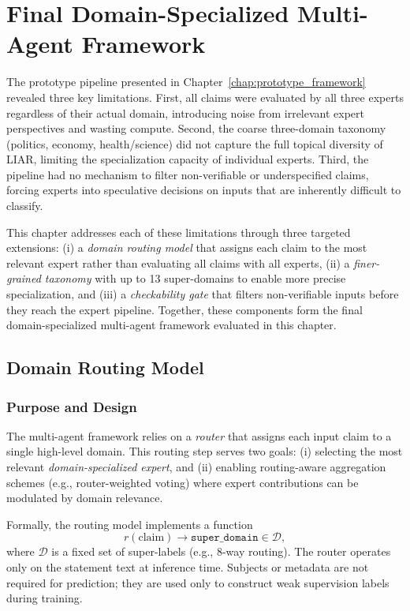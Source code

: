 \chapter{Final Domain-Specialized Multi-Agent Framework}
\label{chap:final_framework}

The prototype pipeline presented in Chapter~\ref{chap:prototype_framework} revealed three key limitations. First, all claims were evaluated by all three experts regardless of their actual domain, introducing noise from irrelevant expert perspectives and wasting compute. Second, the coarse three-domain taxonomy (politics, economy, health/science) did not capture the full topical diversity of LIAR, limiting the specialization capacity of individual experts. Third, the pipeline had no mechanism to filter non-verifiable or underspecified claims, forcing experts into speculative decisions on inputs that are inherently difficult to classify.

This chapter addresses each of these limitations through three targeted extensions: (i) a \emph{domain routing model} that assigns 
each claim to the most relevant expert rather than evaluating all claims with all experts, (ii) a \emph{finer-grained taxonomy} with 
up to 13 super-domains to enable more precise specialization, and (iii) a \emph{checkability gate} that filters non-verifiable inputs before they reach the expert pipeline. Together, these components form the final domain-specialized multi-agent framework evaluated in this chapter.

\section{Domain Routing Model}

\subsection{Purpose and Design}

The multi-agent framework relies on a \emph{router} that assigns each input claim to a single high-level domain. This routing step serves two goals: (i) selecting the most relevant \emph{domain-specialized expert}, and (ii) enabling routing-aware aggregation schemes (e.g., router-weighted voting) where expert contributions can be modulated by domain relevance.

Formally, the routing model implements a function
\[
r(\text{claim}) \rightarrow \texttt{super\_domain} \in \mathcal{D},
\]
where $\mathcal{D}$ is a fixed set of super-labels (e.g., 8-way routing). The router operates only on the statement text at inference time. Subjects or metadata are not required for prediction; they are used only to construct weak supervision labels during training.

